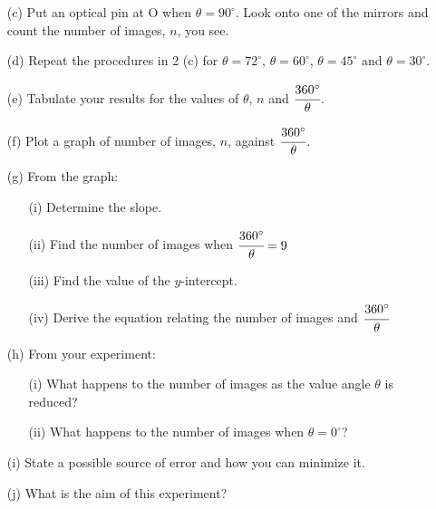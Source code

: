 \begin{enumerate}
\begin{enumerate}
\item[(c)] Put an optical pin at O when $\theta = 90^\circ$. Look onto one of the mirrors and count the number of images, $n$, you see.
\item[(d)] Repeat the procedures in 2 (c) for $\theta = 72^\circ$, $\theta = 60^\circ$, $\theta = 45^\circ$ and $\theta = 30^\circ$.
\item[(e)] Tabulate your results for the values of $\theta$, $n$ and $\cfrac{360^\circ}{\theta}$.
\item[(f)] Plot a graph of number of images, $n$, against $\cfrac{360^\circ}{\theta}$.
\item[(g)] From the graph:
\begin{enumerate}
\item[(i)] Determine the slope.
\item[(ii)] Find the number of images when $\cfrac{360^\circ}{\theta} = 9$
\item[(iii)] Find the value of the $y$-intercept.
\item[(iv)] Derive the equation relating the number of images and $\cfrac{360^\circ}{\theta}$
\end{enumerate}
\item[(h)] From your experiment:
\begin{enumerate}
\item[(i)] What happens to the number of images as the value angle $\theta$ is reduced?
\item[(ii)] What happens to the number of images when $\theta = 0^\circ$?
\end{enumerate}
\item[(i)] State a possible source of error and how you can minimize it.
\item[(j)] What is the aim of this experiment?
\end{enumerate}
\end{enumerate}